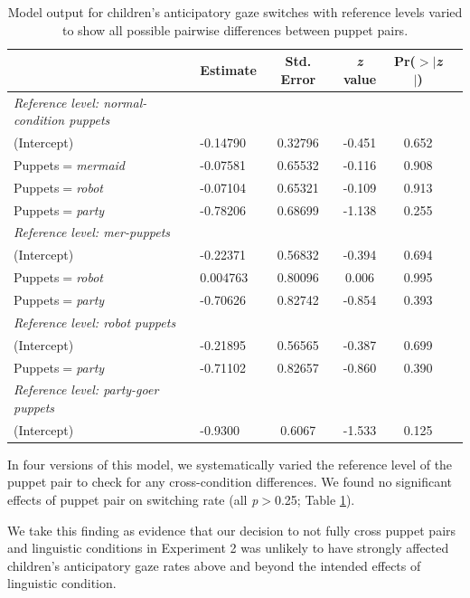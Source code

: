 \documentclass[authoryear, 12pt]{elsarticle}
\begin{document}
\linespread{1}
\begin{table}
\begin{center}
  \begin{tabular}{llcccc}
           &  Estimate & Std. Error & \textit{z} value & Pr($>$$|$\textit{z}$|$) \\    
    \hline
		 \footnotesize{\textit{Reference level: normal-condition puppets}} &&&& \\
    \hline
     (Intercept) 								& -0.14790	& 0.32796	& -0.451		& 0.652 \\ 
     Puppets$=$\textit{mermaid} 	& -0.07581	& 0.65532	& -0.116		& 0.908 \\ 
     Puppets$=$\textit{robot} 		& -0.07104	& 0.65321	& -0.109		& 0.913 \\ 
     Puppets$=$\textit{party} 		& -0.78206	& 0.68699	& -1.138		& 0.255 \\ 
    \hline
		 \footnotesize{\textit{Reference level: mer-puppets}} &&&& \\
    \hline
     (Intercept) 								& -0.22371	& 0.56832	& -0.394		& 0.694 \\ 
     Puppets$=$\textit{robot} 		& 0.004763	& 0.80096	& 0.006		& 0.995 \\ 
     Puppets$=$\textit{party} 		& -0.70626	& 0.82742	& -0.854		& 0.393 \\ 
    \hline
		 \footnotesize{\textit{Reference level: robot puppets}} &&&& \\
    \hline
     (Intercept) 								& -0.21895	& 0.56565	& -0.387		& 0.699 \\ 
     Puppets$=$\textit{party} 		& -0.71102	& 0.82657	& -0.860		& 0.390 \\ 
    \hline
		 \footnotesize{\textit{Reference level: party-goer puppets}} &&&& \\
    \hline
     (Intercept) 								& -0.9300	& 0.6067		& -1.533		& 0.125 \\ 
  \end{tabular}
\end{center}
  \caption{Model output for children's anticipatory gaze switches with reference levels varied to show all possible pairwise differences between puppet pairs.}
\label{tab:control_exp}
\end{table}

In four versions of this model, we systematically varied the reference level of the puppet pair to check for any cross-condition differences. We found no significant effects of puppet pair on switching rate (all \textit{p}$>$0.25; Table \ref{tab:control_exp}).

We take this finding as evidence that our decision to not fully cross puppet pairs and linguistic conditions in Experiment 2 was unlikely to have strongly affected children's anticipatory gaze rates above and beyond the intended effects of linguistic condition.
\end{document}
